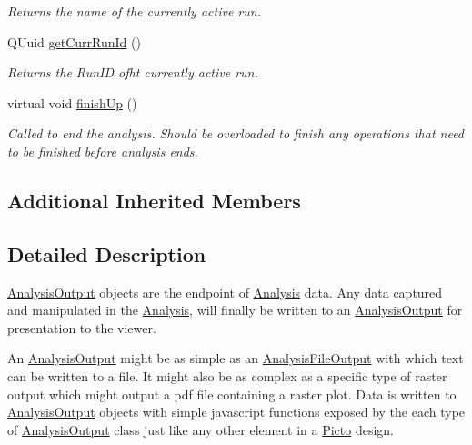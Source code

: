 \begin{DoxyCompactItemize}
\begin{DoxyCompactList}\small\item\em Returns the name of the currently active run. \end{DoxyCompactList}\item 
\hypertarget{class_picto_1_1_analysis_output_a8e86c6233fcab85ac77b13823cd76c8e}{Q\-Uuid \hyperlink{class_picto_1_1_analysis_output_a8e86c6233fcab85ac77b13823cd76c8e}{get\-Curr\-Run\-Id} ()}\label{class_picto_1_1_analysis_output_a8e86c6233fcab85ac77b13823cd76c8e}

\begin{DoxyCompactList}\small\item\em Returns the Run\-I\-D ofht currently active run. \end{DoxyCompactList}\item 
virtual void \hyperlink{class_picto_1_1_analysis_output_acc9c1d8f88deb3b47d0e587434299876}{finish\-Up} ()
\begin{DoxyCompactList}\small\item\em Called to end the analysis. Should be overloaded to finish any operations that need to be finished before analysis ends. \end{DoxyCompactList}\end{DoxyCompactItemize}
\subsection*{Additional Inherited Members}


\subsection{Detailed Description}
\hyperlink{class_picto_1_1_analysis_output}{Analysis\-Output} objects are the endpoint of \hyperlink{class_picto_1_1_analysis}{Analysis} data. Any data captured and manipulated in the \hyperlink{class_picto_1_1_analysis}{Analysis}, will finally be written to an \hyperlink{class_picto_1_1_analysis_output}{Analysis\-Output} for presentation to the viewer. 

An \hyperlink{class_picto_1_1_analysis_output}{Analysis\-Output} might be as simple as an \hyperlink{class_picto_1_1_analysis_file_output}{Analysis\-File\-Output} with which text can be written to a file. It might also be as complex as a specific type of raster output which might output a pdf file containing a raster plot. Data is written to \hyperlink{class_picto_1_1_analysis_output}{Analysis\-Output} objects with simple javascript functions exposed by the each type of \hyperlink{class_picto_1_1_analysis_output}{Analysis\-Output} class just like any other element in a \hyperlink{namespace_picto}{Picto} design.

